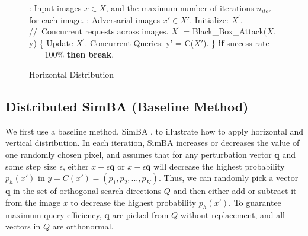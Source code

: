 \begin{figure}[tb]
\begin{minipage}{\textwidth}
\begin{algorithm}[H]
    \centering
    \caption{Horizontal Distribution}
    \label{alg:horizontal}
    \begin{algorithmic}[1]
        : Input images $x \in X$, and the maximum number of iterations $n_{iter}$ for each image.
        : Adversarial images $x' \in X'$. 
        \State
        \State Initialize: $X^{'}$.
        \For {each iteration $n \in [0,\ n_{iter})$}
        \State //\ Concurrent requests across images.
            \State $X^{'}$ = Black\_Box\_Attack$(X$, y)
            \State \{
                \State \hspace{\algorithmicindent}Update $X^{'}$.
                \State \hspace{\algorithmicindent}Concurrent Queries: y{'} = C($X{'}$).
            \State \}
            \State \textbf{if} {success rate == 100\%} \textbf{then} {\textbf{break}}.
        \EndFor
    \end{algorithmic}
\end{algorithm}
\end{minipage}
\end{figure}

\subsection{Distributed SimBA (Baseline Method)}

We first use a baseline method, SimBA \cite{guo2019simple}, to illustrate how to apply horizontal and vertical distribution. In each iteration, SimBA increases or decreases the value of one randomly chosen pixel, and assumes that for any perturbation vector $\boldsymbol{q}$ and some step size $\epsilon$, either $x + \epsilon\boldsymbol{q}$ or $x - \epsilon\boldsymbol{q}$ will decrease the highest probability $p_h(x')$ in $y = C(x')= (p_1, p_2, ..., p_K)$. Thus, we can randomly pick a vector $\boldsymbol{q}$ in the set of orthogonal search directions $Q$ and then either add or subtract it from the image $x$ to decrease the highest probability $p_h(x')$. To guarantee maximum query efficiency, $\boldsymbol{q}$ are picked from $Q$ without replacement, and all vectors in $Q$ are orthonormal.


